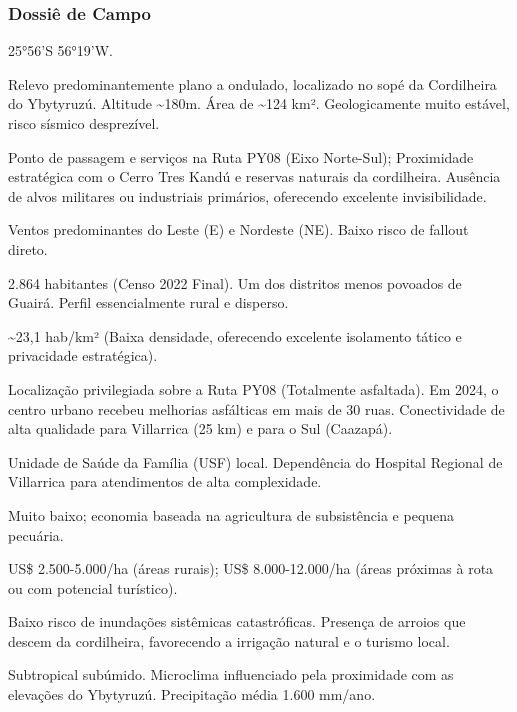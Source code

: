 \subsubsection{Dossiê de Campo}
\begin{description}[style=nextline,leftmargin=0.5cm,font=\bfseries]
\item[Coordenadas]  25°56'S 56°19'W.
\item[Topografia]  Relevo predominantemente plano a ondulado, localizado no sopé da Cordilheira do Ybytyruzú. Altitude \textasciitilde 180m. Área de \textasciitilde 124 km². Geologicamente muito estável, risco sísmico desprezível.
\item[Alvos Estratégicos]  Ponto de passagem e serviços na Ruta PY08 (Eixo Norte-Sul); Proximidade estratégica com o Cerro Tres Kandú e reservas naturais da cordilheira. Ausência de alvos militares ou industriais primários, oferecendo excelente invisibilidade.
\item[Fallout]  Ventos predominantes do Leste (E) e Nordeste (NE). Baixo risco de fallout direto.
\item[População]  2.864 habitantes (Censo 2022 Final). Um dos distritos menos povoados de Guairá. Perfil essencialmente rural e disperso.
\item[Densidade]  \textasciitilde 23,1 hab/\allowbreak km² (Baixa densidade, oferecendo excelente isolamento tático e privacidade estratégica).
\item[Vias de Acesso]  Localização privilegiada sobre a Ruta PY08 (Totalmente asfaltada). Em 2024, o centro urbano recebeu melhorias asfálticas em mais de 30 ruas. Conectividade de alta qualidade para Villarrica (25 km) e para o Sul (Caazapá).
\item[Serviços]  Unidade de Saúde da Família (USF) local. Dependência do Hospital Regional de Villarrica para atendimentos de alta complexidade.
\item[Custo de Vida]  Muito baixo; economia baseada na agricultura de subsistência e pequena pecuária.
\item[Preço da Terra]  US\$ 2.500-5.000/\allowbreak ha (áreas rurais); US\$ 8.000-12.000/\allowbreak ha (áreas próximas à rota ou com potencial turístico).
\item[Hidrologia]  Baixo risco de inundações sistêmicas catastróficas. Presença de arroios que descem da cordilheira, favorecendo a irrigação natural e o turismo local.
\item[Clima]  Subtropical subúmido. Microclima influenciado pela proximidade com as elevações do Ybytyruzú. Precipitação média 1.600 mm/\allowbreak ano.

\end{description}
